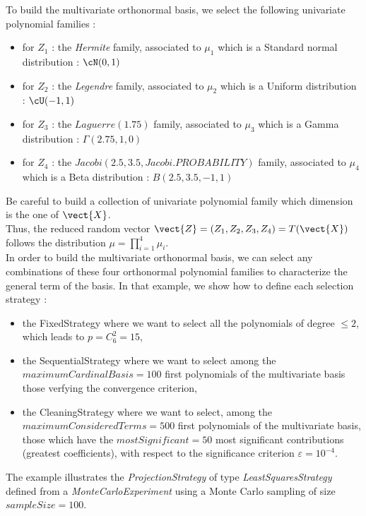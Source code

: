 To build the multivariate orthonormal basis, we select the following univariate polynomial families :
\begin{itemize}
\item for $Z_1$ : the \textit{Hermite} family, associated to  $\mu_1$ which is a Standard normal distribution : $\cN(0,1)$
\item for $Z_2$ : the \textit{Legendre} family, associated to  $\mu_2$ which is a Uniform distribution : $\cU(-1,1)$
\item for $Z_3$ : the $Laguerre(1.75)$ family, associated to  $\mu_3$ which is a Gamma distribution : ${\Gamma}(2.75,1,0)$
\item for $Z_4$ : the $Jacobi(2.5, 3.5, Jacobi.PROBABILITY)$ family, associated to  $\mu_4$ which  is a Beta distribution : $B(2.5, 3.5,-1,1)$
\end{itemize}
Be careful to build a collection of univariate polynomial family which dimension is the one of $\vect{X}$.\\

Thus, the reduced random vector $\vect{Z}=(Z_1,Z_2,Z_3,Z_4) = T(\vect{X})$ follows the distribution $\mu = \prod_{i=1}^{4} \mu_i$.\\

In order to build the multivariate orthonormal basis, we can select any combinations of these four orthonormal polynomial families to characterize the general term of the basis.  In that example, we show how to define each selection strategy :
\begin{itemize}
\item the FixedStrategy where we want to select all the polynomials of degree $\leq 2$, which leads to $p=C_6^2 = 15$,
\item the SequentialStrategy where we want to select among the $maximumCardinalBasis = 100$ first polynomials of the multivariate basis those verfying the convergence criterion,
\item the CleaningStrategy where we want to select, among the $maximumConsideredTerms = 500$ first polynomials of the multivariate basis, those which have the $mostSignificant = 50$ most significant contributions (greatest coefficients), with respect to the significance criterion $\varepsilon = 10^{-4}$.
\end{itemize}

The example illustrates the \emph{ProjectionStrategy} of type \emph{LeastSquaresStrategy} defined from a \emph{MonteCarloExperiment} using a  Monte Carlo sampling of size  $sampleSize = 100$. \\


